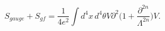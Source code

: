 \begin{equation}
S_{gauge} + S_{gf} = \frac{1}{4 e^2}\int d^4x\,d^4\theta
V\partial^2 \Big(1+ \frac{\partial^{2n}}{\Lambda^{2n}}\Big) V.
\end{equation}

